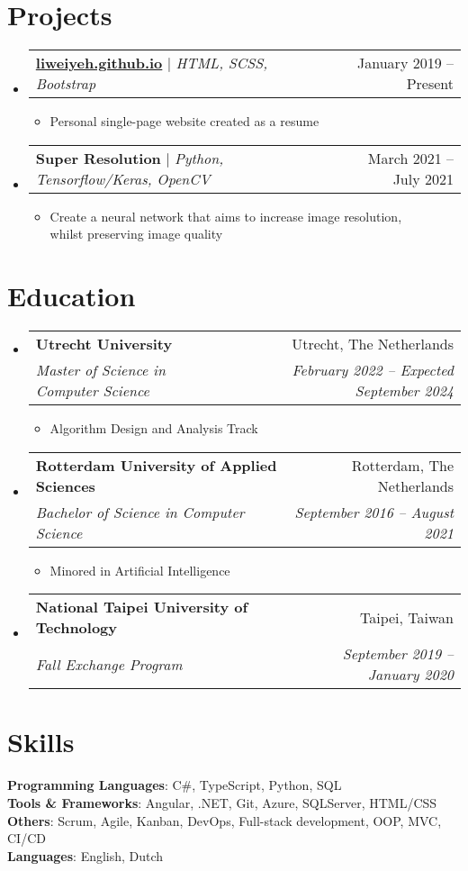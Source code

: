 \documentclass[letterpaper,11pt]{article}
\makeatletter
\newcommand{\resumeItem}[1]{
	\item\small{
		{#1 \vspace{-2pt}}
	}
}
\newcommand{\resumeSubheading}[4]{
	\vspace{4pt}\item
	\begin{tabular*}{0.97\textwidth}[t]{l@{\extracolsep{\fill}}r}
		\textbf{#1} & #2 \\
		\textit{\small#3} & \textit{\small #4} \\
	\end{tabular*}\vspace{-7pt}
}
\newcommand{\resumeProjectHeading}[2]{
	\vspace{4pt}\item
	\begin{tabular*}{0.97\textwidth}{l@{\extracolsep{\fill}}r}
		\small#1 & #2 \\
	\end{tabular*}\vspace{-7pt}
}
\newcommand{\resumeSubHeadingListStart}{\begin{itemize}[leftmargin=0.15in, label={}]}
\newcommand{\resumeSubHeadingListEnd}{\end{itemize}}
\newcommand{\resumeItemListStart}{\begin{itemize}}
\newcommand{\resumeItemListEnd}{\end{itemize}\vspace{-5pt}}
\makeatother
\begin{document}
	\section{Projects}
	\resumeSubHeadingListStart
	
	\resumeProjectHeading
	{\textbf{\href{https://liweiyeh.github.io/}{liweiyeh.github.io}} $|$ \emph{HTML, SCSS, Bootstrap}}{January 2019 -- Present}
	\resumeItemListStart
	\resumeItem{Personal single-page website created as a resume}
	\resumeItemListEnd
	
	\resumeProjectHeading
	{\textbf{Super Resolution} $|$ \emph{Python, Tensorflow/Keras, OpenCV}}{March 2021 -- July 2021}
	\resumeItemListStart
	\resumeItem{Create a neural network that aims to increase image resolution, \\whilst preserving image quality}
	\resumeItemListEnd
	
	\resumeSubHeadingListEnd
	
	
	
	\section{Education}
	\resumeSubHeadingListStart
	\resumeSubheading
	{Utrecht University}{Utrecht, The Netherlands}
	{Master of Science in Computer Science}{February 2022 -- Expected September 2024}
	\resumeItemListStart
	\resumeItem{Algorithm Design and Analysis Track}
	\resumeItemListEnd
	
	\resumeSubheading
	{Rotterdam University of Applied Sciences}{Rotterdam, The Netherlands}
	{Bachelor of Science in Computer Science}{September 2016 -- August 2021}
	\resumeItemListStart
	\resumeItem{Minored in Artificial Intelligence}
	\resumeItemListEnd
	
	\resumeSubheading
	{National Taipei University of Technology}{Taipei, Taiwan}
	{Fall Exchange Program}{September 2019 -- January 2020}
	\resumeSubHeadingListEnd
	
	
	
	\section{Skills}
	\begin{itemize}[leftmargin=0.15in, label={}]
		\small{\item{
				\textbf{Programming Languages}{: C\#, TypeScript, Python, SQL} \\
				\textbf{Tools \& Frameworks}{: Angular, .NET, Git, Azure, SQLServer, HTML/CSS} \\ 
				\textbf{Others}{: Scrum, Agile, Kanban, DevOps, Full-stack development, OOP, MVC, CI/CD} \\
				\textbf{Languages}{: English, Dutch} \\
		}}
	\end{itemize}
	
\end{document}
